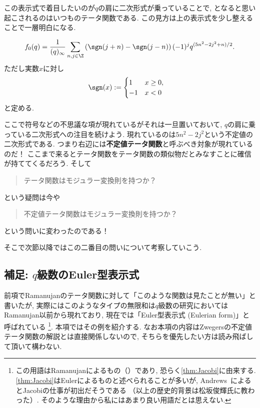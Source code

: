 \documentclass[11pt,b5paper,oneside,lualatex]{ltjsarticle} %
\numberwithin{equation}{section} %
\begin{document}
この表示式で着目したいのが$ q $の肩に二次形式が乗っていることで, となると思い起こされるのはいつものテータ関数である. 
この見方は上の表示式を少し整えることで一層明白になる. 

\begin{cor} \label{cor:mock_indefinite}
	\[
	f_0 (q) = \frac{1}{(q)_\infty}
	\sum_{n, j \in \Z} \left( \sgn(j+n) - \sgn(j-n) \right) (-1)^j q^{(5n^2 - 2j^2 + n)/2}.
	\]	
	ただし実数$ x $に対し
	\begin{align}
		\sgn(x) &:= 
		\begin{cases}
			1 & x \ge 0, \\
			-1 & x < 0
		\end{cases}
	\end{align}
	と定める. 
\end{cor}

ここで符号などの不思議な項が現れているがそれは一旦置いておいて, $ q $の肩に乗っている二次形式への注目を続けよう. 
現れているのは$ 5n^2 - 2j^2 $という不定値の二次形式である. 
つまり右辺には\textbf{不定値テータ関数}と呼ぶべき対象が現れているのだ！
ここまで来るとテータ関数をテータ関数の類似物だとみなすことに確信が持ててくるだろう. 
そして
\begin{quote}
	\centering
	テータ関数はモジュラー変換則を持つか？
\end{quote}
という疑問は今や
\begin{quote}
	\centering
	不定値テータ関数はモジュラー変換則を持つか？
\end{quote}
という問いに変わったのである！

そこで次節以降ではこの二番目の問いについて考察していこう. 


\subsection{補足: $ q $級数のEuler型表示式} \label{subsec:Eulerian_form}


前項でRamanujanのテータ関数に対して「このような関数は見たことが無い」と書いたが, 実際にはこのようなタイプの無限和は$ q $級数の研究においてはRamanujan以前から現れており, 現在では「Euler型表示式 (Eulerian form)」と呼ばれている
\footnote{この用語はRamanujanによるもの（\cite[119ページ]{魅惑}）であり, 恐らく\cref{thm:Jacobi}に由来する. 
	\cref{thm:Jacobi}はEulerによるものと述べられることが多いが, Andrews~\cite{Andrews_combi}によるとJacobiの仕事が初出だそうである
	（以上の歴史的背景は松坂俊輝氏に教わった）. 
	そのような理由から私にはあまり良い用語だとは思えない. }. 
本項ではその例を紹介する. 
なお本項の内容はZwegersの不定値テータ関数の解説とは直接関係しないので, そちらを優先したい方は読み飛ばして頂いて構わない. 
\end{document}
